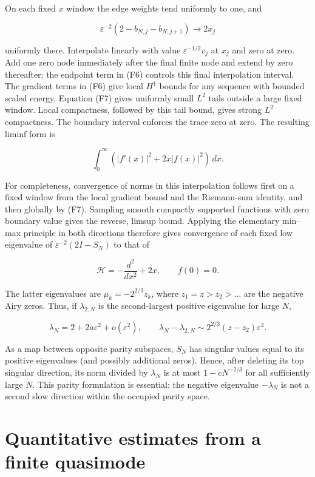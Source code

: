 \documentclass[11pt,letterpaper]{article}
\numberwithin{equation}{section}
\theoremstyle{remark}
\begin{document}
On each fixed \(x\) window the edge weights tend uniformly to one, and

\[
\varepsilon^{-2}(2-b_{N,j}-b_{N,j+1})\longrightarrow 2x_j
\]

uniformly there. Interpolate linearly with value \(\varepsilon ^{-1/2}v_j\) at \(x_j\) and zero at zero. Add one zero node immediately after the final finite node and extend by zero thereafter; the endpoint term in (F6) controls this final interpolation interval. The gradient terms in (F6) give local \(H^1\) bounds for any sequence with bounded scaled energy. Equation (F7) gives uniformly small \(L^2\) tails outside a large fixed window. Local compactness, followed by this tail bound, gives strong \(L^2\) compactness. The boundary interval enforces the trace zero at zero. The resulting liminf form is

\[
\int_0^\infty (|f'(x)|^2+2x|f(x)|^2)\,dx.
\]

For completeness, convergence of norms in this interpolation follows first on a fixed window from the local gradient bound and the Riemann-sum identity, and then globally by (F7). Sampling smooth compactly supported functions with zero boundary value gives the reverse, limsup bound. Applying the elementary min--max principle in both directions therefore gives convergence of each fixed low eigenvalue of \(\varepsilon ^{-2}(2I-S_N)\) to that of

\[
\mathcal H=-\frac{d^2}{dx^2}+2x,
\qquad f(0)=0.
\]

The latter eigenvalues are \(\mu _k=-2^{2/3}z_k\), where \(z_1=z>z_2>\ldots\) are the negative Airy zeros. Thus, if \(\lambda _{2,N}\) is the second-largest positive eigenvalue for large \(N\),

\[
\lambda_N=2+2a\varepsilon^2+o(\varepsilon^2),\qquad
\lambda_N-\lambda_{2,N}
\sim 2^{2/3}(z-z_2)\varepsilon^2.
\tag{F8}
\]

As a map between opposite parity subspaces, \(S_N\) has singular values equal to its positive eigenvalues (and possibly additional zeros). Hence, after deleting its top singular direction, its norm divided by \(\lambda _N\) is at most \(1-cN^{-2/3}\) for all sufficiently large \(N\). This parity formulation is essential: the negative eigenvalue \(-\lambda _N\) is not a second slow direction within the occupied parity space.

\section{Quantitative estimates from a finite quasimode}\label{air:rb:quantitative-estimates-from-a-finite-quasimode}
\end{document}
